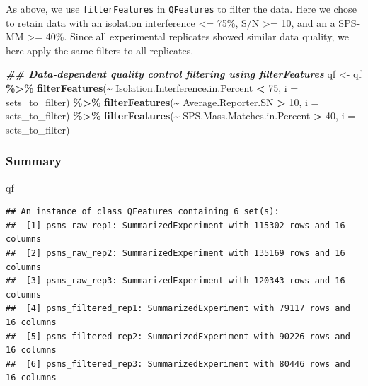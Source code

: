 \documentclass[9pt,a4paper,]{extarticle}
\newenvironment{Shaded}{\begin{snugshade}}{\end{snugshade}}
\newcommand{\AttributeTok}[1]{\textcolor[rgb]{0.13,0.29,0.53}{#1}}
\newcommand{\DecValTok}[1]{\textcolor[rgb]{0.00,0.00,0.81}{#1}}
\newcommand{\DocumentationTok}[1]{\textcolor[rgb]{0.56,0.35,0.01}{\textbf{\textit{#1}}}}
\newcommand{\FunctionTok}[1]{\textcolor[rgb]{0.13,0.29,0.53}{\textbf{#1}}}
\newcommand{\NormalTok}[1]{#1}
\newcommand{\OtherTok}[1]{\textcolor[rgb]{0.56,0.35,0.01}{#1}}
\newcommand{\SpecialCharTok}[1]{\textcolor[rgb]{0.81,0.36,0.00}{\textbf{#1}}}
\begin{document}
As above, we use \texttt{filterFeatures} in \texttt{QFeatures} to filter the data. Here we
chose to retain data with an isolation interference \textless= 75\%, S/N \textgreater= 10, and an
a SPS-MM \textgreater= 40\%. Since all experimental replicates showed similar data quality, we
here apply the same filters to all replicates.

\begin{Shaded}
\begin{Highlighting}[]
\DocumentationTok{\#\# Data{-}dependent quality control filtering using filterFeatures}
\NormalTok{qf }\OtherTok{\textless{}{-}}\NormalTok{ qf }\SpecialCharTok{\%\textgreater{}\%} 
  \FunctionTok{filterFeatures}\NormalTok{(}\SpecialCharTok{\textasciitilde{}}\NormalTok{ Isolation.Interference.in.Percent }\SpecialCharTok{\textless{}} \DecValTok{75}\NormalTok{, }\AttributeTok{i =}\NormalTok{ sets\_to\_filter) }\SpecialCharTok{\%\textgreater{}\%}
  \FunctionTok{filterFeatures}\NormalTok{(}\SpecialCharTok{\textasciitilde{}}\NormalTok{ Average.Reporter.SN }\SpecialCharTok{\textgreater{}} \DecValTok{10}\NormalTok{, }\AttributeTok{i =}\NormalTok{ sets\_to\_filter) }\SpecialCharTok{\%\textgreater{}\%}
  \FunctionTok{filterFeatures}\NormalTok{(}\SpecialCharTok{\textasciitilde{}}\NormalTok{ SPS.Mass.Matches.in.Percent }\SpecialCharTok{\textgreater{}} \DecValTok{40}\NormalTok{, }\AttributeTok{i =}\NormalTok{ sets\_to\_filter)}
\end{Highlighting}
\end{Shaded}

\subsubsection{Summary}\label{summary}

\begin{Shaded}
\begin{Highlighting}[]
\NormalTok{qf}
\end{Highlighting}
\end{Shaded}

\begin{verbatim}
## An instance of class QFeatures containing 6 set(s):
##  [1] psms_raw_rep1: SummarizedExperiment with 115302 rows and 16 columns 
##  [2] psms_raw_rep2: SummarizedExperiment with 135169 rows and 16 columns 
##  [3] psms_raw_rep3: SummarizedExperiment with 120343 rows and 16 columns 
##  [4] psms_filtered_rep1: SummarizedExperiment with 79117 rows and 16 columns 
##  [5] psms_filtered_rep2: SummarizedExperiment with 90226 rows and 16 columns 
##  [6] psms_filtered_rep3: SummarizedExperiment with 80446 rows and 16 columns
\end{verbatim}
\end{document}
